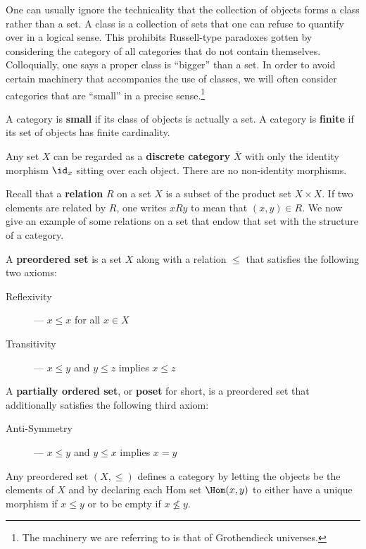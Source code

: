 One can usually ignore the technicality that the collection of objects forms a class rather than a set. A class is a collection of sets that one can refuse to quantify over in a logical sense. This prohibits Russell-type paradoxes gotten by considering the category of all categories that do not contain themselves. Colloquially, one says a proper class is ``bigger'' than a set. In order to avoid certain machinery that accompanies the use of classes, we will often consider categories that are ``small'' in a precise sense.\footnote{The machinery we are referring to is that of Grothendieck universes.}

\begin{defn}
	A category is \textbf{small} if its class of objects is actually a set. A category is \textbf{finite} if its set of objects has finite cardinality.
\end{defn}

\begin{ex}
	Any set $X$ can be regarded as a \textbf{discrete category} $\bar{X}$ with only the identity morphism $\id_x$ sitting over each object. There are no non-identity morphisms.
\end{ex}

Recall that a \textbf{relation} $R$ on a set $X$ is a subset of the product set $X\times X$. If two elements are related by $R$, one writes $x R y$ to mean that $(x,y)\in R$. We now give an example of some relations on a set that endow that set with the structure of a category.

\begin{ex}
	A \textbf{preordered set} is a set $X$ along with a relation $\leq$ that satisfies the following two axioms:
\begin{description}
 \item[Reflexivity] --- $x\leq x$ for all $x\in X$
 \item[Transitivity] --- $x\leq y$ and $y\leq z$ implies $x\leq z$
\end{description}
	A \textbf{partially ordered set}, or \textbf{poset} for short, is a preordered set that additionally satisfies the following third axiom:
	\begin{description}
		\item[Anti-Symmetry] --- $x\leq y$ and $y\leq x$ implies $x=y$
	\end{description}
Any preordered set $(X,\leq)$ defines a category by letting the objects be the elements of $X$ and by declaring each Hom set $\Hom(x,y)$ to either have a unique morphism if $x\leq y$ or to be empty if $x\nleq y$. 
\end{ex}

